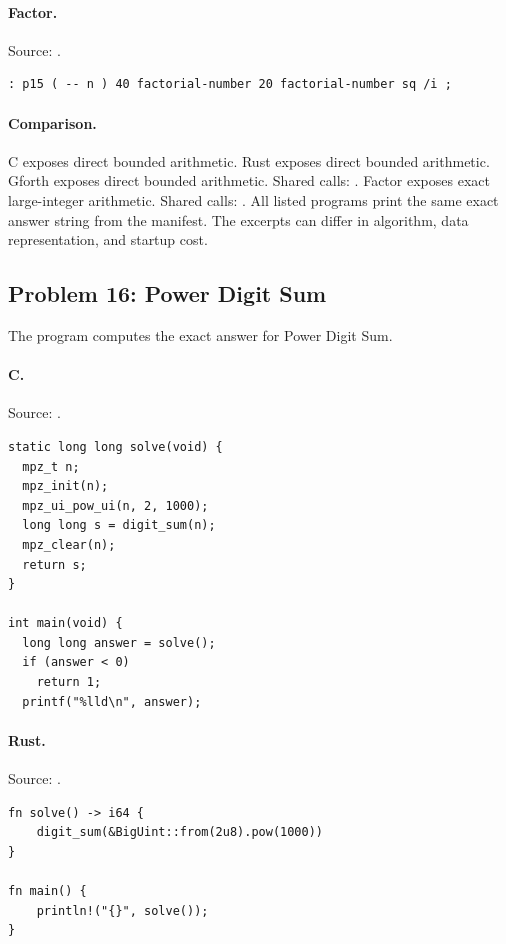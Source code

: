 \paragraph{Factor.} Source: .
\begin{lstlisting}
: p15 ( -- n ) 40 factorial-number 20 factorial-number sq /i ;
\end{lstlisting}

\paragraph{Comparison.}
C exposes direct bounded arithmetic. Rust exposes direct bounded arithmetic. Gforth exposes direct bounded arithmetic. Shared calls: \texttt{}. Factor exposes exact large-integer arithmetic. Shared calls: \texttt{}.
All listed programs print the same exact answer string from the manifest. The excerpts can differ in algorithm, data representation, and startup cost.

\subsection{Problem 16: Power Digit Sum}
\label{walkthrough:p16}
The program computes the exact answer for Power Digit Sum.

\paragraph{C.} Source: .
\begin{lstlisting}
static long long solve(void) {
  mpz_t n;
  mpz_init(n);
  mpz_ui_pow_ui(n, 2, 1000);
  long long s = digit_sum(n);
  mpz_clear(n);
  return s;
}

int main(void) {
  long long answer = solve();
  if (answer < 0)
    return 1;
  printf("%lld\n", answer);
\end{lstlisting}

\paragraph{Rust.} Source: .
\begin{lstlisting}
fn solve() -> i64 {
    digit_sum(&BigUint::from(2u8).pow(1000))
}

fn main() {
    println!("{}", solve());
}
\end{lstlisting}

